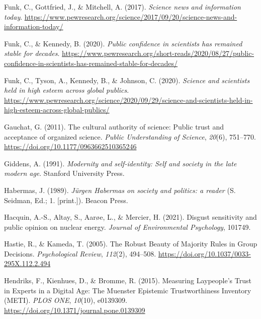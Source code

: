 \documentclass[
  jou,
  floatsintext,
  longtable,
  nolmodern,
  notxfonts,
  notimes,
  colorlinks=true,linkcolor=blue,citecolor=blue,urlcolor=blue]{apa7}
\newlength{\cslhangindent}
\newenvironment{CSLReferences}[2] %
 {\begin{list}{}{%
  \setlength{\itemindent}{0pt}
  \setlength{\leftmargin}{0pt}
  \setlength{\parsep}{0pt}
  \ifodd #1
   \setlength{\leftmargin}{\cslhangindent}
   \setlength{\itemindent}{-1\cslhangindent}
  \fi
  \setlength{\itemsep}{#2\baselineskip}}}
 {\end{list}}
\begin{document}
\begin{CSLReferences}{1}{0}
Funk, C., Gottfried, J., \& Mitchell, A. (2017). \emph{Science news and
information today}.
\url{https://www.pewresearch.org/science/2017/09/20/science-news-and-information-today/}

Funk, C., \& Kennedy, B. (2020). \emph{Public confidence in scientists
has remained stable for decades}.
\url{https://www.pewresearch.org/short-reads/2020/08/27/public-confidence-in-scientists-has-remained-stable-for-decades/}

Funk, C., Tyson, A., Kennedy, B., \& Johnson, C. (2020). \emph{Science
and scientists held in high esteem across global publics}.
\url{https://www.pewresearch.org/science/2020/09/29/science-and-scientists-held-in-high-esteem-across-global-publics/}

Gauchat, G. (2011). The cultural authority of science: Public trust and
acceptance of organized science. \emph{Public Understanding of Science},
\emph{20}(6), 751--770. \url{https://doi.org/10.1177/0963662510365246}

Giddens, A. (1991). \emph{Modernity and self-identity: Self and society
in the late modern age}. Stanford University Press.

Habermas, J. (1989). \emph{Jürgen Habermas on society and politics: a
reader} (S. Seidman, Ed.; 1. {[}print.{]}). Beacon Press.

Hacquin, A.-S., Altay, S., Aarøe, L., \& Mercier, H. (2021). Disgust
sensitivity and public opinion on nuclear energy. \emph{Journal of
Environmental Psychology}, 101749.

Hastie, R., \& Kameda, T. (2005). The Robust Beauty of Majority Rules in
Group Decisions. \emph{Psychological Review}, \emph{112}(2), 494--508.
\url{https://doi.org/10.1037/0033-295X.112.2.494}

Hendriks, F., Kienhues, D., \& Bromme, R. (2015). Measuring
Laypeople{'}s Trust in Experts in a Digital Age: The Muenster Epistemic
Trustworthiness Inventory (METI). \emph{PLOS ONE}, \emph{10}(10),
e0139309. \url{https://doi.org/10.1371/journal.pone.0139309}


\end{CSLReferences}
\end{document}

